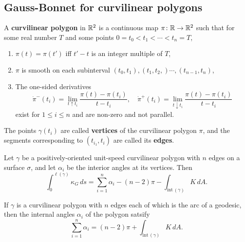   \subsection{Gauss-Bonnet for curvilinear polygons}
  \begin{definition}[]
      A \textbf{curvilinear polygon} in $\mathbb{R}^2$ is a continuous map $\pi \colon \mathbb{R} \to \mathbb{R}^2$ such that for some real number $T$ and some points $0=t_0<t_1< \cdots < t_n  =T$,
      \begin{enumerate}[label=(\roman*)]
      \setlength\itemsep{-.2em}
  \item $\pi(t)=\pi(t')$ iff $t'-t$ is an integer multiple of $T$,
  \item $\pi$ is smooth on each subinterval $(t_0,t_1),(t_1,t_2,)\cdots ,(t_{n-1},t_n )$,
    \item The one-sided derivatives \[
            \dot \pi ^- (t_i )= \lim _{t \uparrow t_i }\frac{\pi(t)-\pi(t_i )}{t-t_i },\quad \dot \pi^+(t_i )=\lim _{t\downarrow t_i }\frac{\pi(t)-\pi(t_i )}{t-t_i }
    \] exist for $1\leq i \leq n$ and are non-zero and not parallel.
      \end{enumerate}
      The points $\gamma (t_i )$ are called \textbf{vertices} of the curvilinear polygon $\pi$, and the segments corresponding to $(t_{i_1},t_i )$ are called its \textbf{edges}.
  \end{definition}
  \begin{theorem}
      Let $\gamma $ be a positively-oriented unit-speed curvilinear polygon with $n$ edges on a surface $\sigma$, and let $\alpha _i $ be the interior angles at its vertices. Then \[
          \int_{0}^{\ell(\gamma )} \kappa_G \, ds = \sum_{i=1}^{n}\alpha _i  - (n-2)\pi -\int _{\text{int} \, (\gamma )}K\,d A.
      \] 
  \end{theorem}
  \begin{cor}
      If $\gamma $ is a curvilinear polygon with $n$ edges each of which is the arc of a geodesic, then the internal angles $\alpha _i $ of the polygon satsify \[
          \sum_{i=1}^{n} \alpha _i =(n-2)\pi + \int _{\text{int} \,(\gamma )}K\,dA.
      \] 
  \end{cor}

